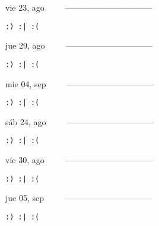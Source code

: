 \documentclass[letterpaper,10pt]{article}
\begin{document}
\begin{multicols}{3}
{vie 23, ago\ \ \ \ \ --------------------------------}
\begin{flushright}\begin{small}\texttt{:) :| :(}\end{small}\end{flushright}
\vfill
{jue 29, ago\ \ \ \ \ --------------------------------}
\begin{flushright}\begin{small}\texttt{:) :| :(}\end{small}\end{flushright}\par
\vfill
{mie 04, sep\ \ \ \ \ --------------------------------}
\begin{flushright}\begin{small}\texttt{:) :| :(}\end{small}\end{flushright}\par
\vfill
\end{multicols}
\vspace{1.05cm}

\begin{multicols}{3}
{sáb 24, ago\ \ \ \ \ --------------------------------}
\begin{flushright}\begin{small}\texttt{:) :| :(}\end{small}\end{flushright}
\vfill
{vie 30, ago\ \ \ \ \ --------------------------------}
\begin{flushright}\begin{small}\texttt{:) :| :(}\end{small}\end{flushright}\par
\vfill
{jue 05, sep\ \ \ \ \ --------------------------------}
\begin{flushright}\begin{small}\texttt{:) :| :(}\end{small}\end{flushright}\par
\vfill
\end{multicols}
\vspace{1.05cm}
\end{document}
